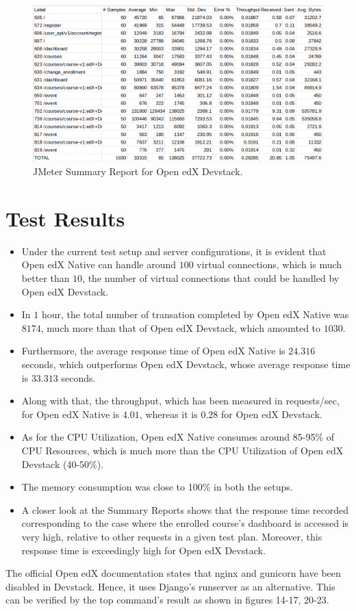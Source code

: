 \documentclass[12pt]{article}
\begin{document}
\begin{figure}[h!]
	\centering
	\includegraphics[width=\textwidth,height=\textheight,keepaspectratio]{intro/4.png}
	\caption{JMeter Summary Report for Open edX Devstack.}
\end{figure}
\clearpage
\section*{Test Results} 
\begin{itemize}
	\item Under the current test setup and server configurations, it is evident that Open edX Native can handle around $100$ virtual connections, which is much better than $10$, the number of virtual connections that could be handled by Open edX Devstack.
	\item In $1$ hour, the total number of transation completed by Open edX Native was $8174$, much more than that of Open edX Devstack, which amounted to $1030$.
	\item Furthermore, the average response time of Open edX Native is $24.316$ seconds, which outperforms Open edX Devstack, whose average response time is $33.313$ seconds.
	\item Along with that, the throughput, which has been measured in requests/sec, for Open edX Native is $4.01$, whereas it is $0.28$ for Open edX Devstack.
	\item As for the CPU Utilization, Open edX Native consumes around 85-95\% of CPU Resources, which is much more than the CPU Utilization of Open edX Devstack (40-50\%).
	\item The memory consumption was close to 100\% in both the setups.
	\item A closer look at the Summary Reports shows that the response time recorded corresponding to the case where the enrolled course's dashboard is accessed is very high, relative to other requests in a given test plan. Moreover, this response time is exceedingly high for Open edX Devstack.
\end{itemize}

\par
The official Open edX documentation states that nginx and gunicorn have been disabled in Devstack. Hence, it uses Django's runserver as an alternative. This can be verified by the top command's result as shown in figures 14-17, 20-23.




\end{document}
